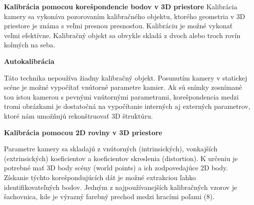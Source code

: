 \textbf{Kalibrácia pomocou korešpondencie bodov v 3D priestore}\newline
Kalibrácia kamery sa vykonáva pozorovaním kalibračného objektu, ktorého geometria v 3D priestore je známa s veľmi presnou presnosťou. Kalibráciu je možné vykonať veľmi efektívne. Kalibračný objekt sa obvykle skladá z dvoch alebo troch rovín kolmých na seba.

\textbf{Autokalibrácia} 

Táto technika nepoužíva žiadny kalibračný objekt. Posunutím kamery v statickej scéne je možné vypočítať vnútorné parametre kamier. Ak sú snímky zosnímané tou istou kamerou s pevnými vnútornými parametrami, korešpondencia medzi tromi obrázkami je dostatočná na vypočítanie interných aj externých parametrov, ktoré nám umožňujú rekonštruovať 3D štruktúru. 

\textbf{Kalibrácia pomocou 2D roviny v 3D priestore}




Parametre kamery sa skladajú z vnútorných (intrinsických), vonkajších (extrinsických) koeficientov a koeficientov skreslenia (distortion). K určeniu je potrebné mať 3D body scény (world points) a ich zodpovedajúce 2D body. Získanie týchto korešpondujúcích dát je možné extrakciou ľahko identifikovateľných bodov. Jedným z najpoužívanejších kalibračných vzorov je šachovnica, kde je výrazný farebný prechod medzi hracími poľami (8).



